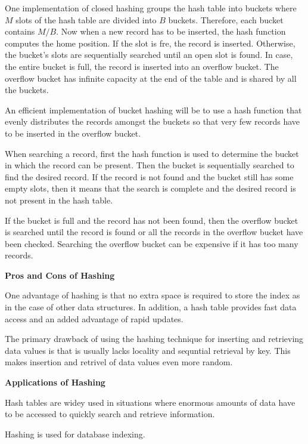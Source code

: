 \vskip 1mm
One implementation of closed hashing groups the hash table into buckets where $M$ slots of the hash table are divided into $B$ buckets. Therefore, each bucket contains $M/B$. Now when a new record has to be inserted, the hash function computes the home position. If the slot is fre, the record is inserted. Otherwise, the bucket's slots are sequentially searched until an open slot is found. In case, the entire bucket is full, the record is inserted into an overflow bucket. The overflow bucket has infinite capacity at the end of the table and is shared by all the buckets.

\vskip 1mm
An efficient implementation of bucket hashing will be to use a hash function that evenly distributes the records amongst the buckets so that very few records have to be inserted in the overflow bucket.

\vskip 1mm
When searching a record, first the hash function is used to determine the bucket in which the record can be present. Then the bucket is sequentially searched to find the desired record. If the record is not found and the bucket still has some empty slots, then it means that the search is complete and the desired record is not present in the hash table.

\vskip 1mm
If the bucket is full and the record has not been found, then the overflow bucket is searched until the record is found or all the records in the overflow bucket have been checked. Searching the overflow bucket can be expensive if it has too many records.

\filbreak
\vskip 1cm
{\bf Pros and Cons of Hashing}

\vskip 1mm
One advantage of hashing is that no extra space is required to store the index as in the case of other data structures. In addition, a hash table provides fast data access and an added advantage of rapid updates.

\vskip 1mm
The primary drawback of using the hashing technique for inserting and retrieving data values is that is usually lacks locality and sequntial retrieval by key. This makes insertion and retrivel of data values even more random.

\filbreak
\vskip 1cm
{\bf Applications of Hashing}

\vskip 1mm
Hash tables are widey used in situations where enormous amounts of data have to be accessed to quickly search and retrieve information.

\vskip 1mm
Hashing is used for database indexing. 

